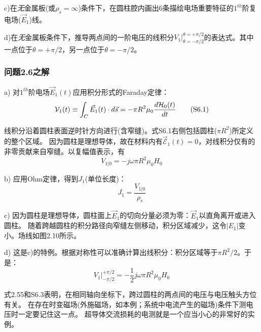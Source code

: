 c)在\textit{无}金属板(或$\rho_s=\infty$)条件下，在圆柱腔内画出6条描绘电场重要特征的$1^{th}$阶复电场($\vec{E}_1$)线。

d)在\textit{无}金属板条件下，推导两点间的一阶电压的线积分$V_1 |_{\theta=-\pi/2}^{\theta=+\pi/2}$的表达式。其中一点位于$\theta=+\pi/2$，另一点位于$\theta=-\pi/2$。



\subsubsection*{问题2.6之解}
a) 对$1^{th}$阶电场$\vec{E}_1(t)$应用积分形式的Faraday定律：
\begin{equation*}
\CMcal{V}_1(t) \equiv \int_{C} \vec{E}_1 (t) \cdot d\vec{s}=-\pi R^2 \mu_0 \frac{d\CMcal{H}_0(t)}{dt} \tag{S6.1}
\end{equation*}

线积分沿着圆柱表面逆时针方向进行(含窄缝)。式S6.1右侧包括圆柱($\pi R^2$)所定义的整个区域。
因为圆柱是理想导体，故在材料内有$\vec{\mathcal{E}}_1(t)=0$，对线积分仅有的非零贡献来自窄缝。以复幅值表示，有
\begin{equation*}
V_{1|0}=-j\omega \pi R^2 \mu_0 H_0 \tag{2.55}
\end{equation*}

b) 应用Ohm定律，得到$J_1$(单位长度)：
\begin{equation*}
J_1=\frac{V_{1|0}}{\rho_s} \tag{S6.2}
\end{equation*}

c) 因为圆柱是理想导体，圆柱面上$\vec{E}_1$的切向分量必须为零：$\vec{E}_1$以直角离开或进入圆柱。
随着跨越圆柱的积分路径向窄缝左侧移动，积分区域减少，这令$|E_1|$变小。场线如图2.10所示。

d) 这是c)的特例。根据对称性可以准确计算出线积分：积分区域等于$\pi R^2/2$。于是：
\begin{equation*}
V_1 |_{-\pi/2}^{+\pi/2}=-\frac{1}{2}j\omega \pi R^2 \mu_0 H_0   \tag{S6.3}
\end{equation*}

式2.55和S6.3表明，在相同轴向坐标下，跨过圆柱的两点间的电压与电压触头方位有关。
在存在时变磁场(外施磁场，如本例；系统中电流产生的磁场)条件下测电压时一定要记住这一点。
超导体交流损耗的电测就是一个应当小心的非常好的实例。

